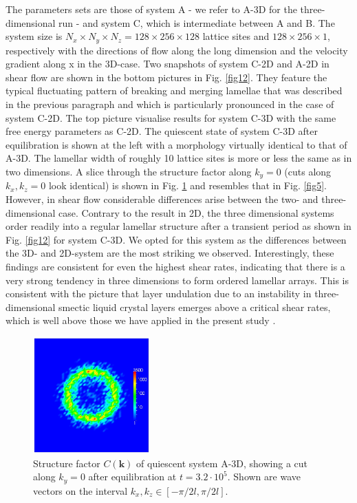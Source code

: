 \documentclass[8.5pt,twoside,twocolumn]{article}
\newcommand{\e}[1]{\cdot10^{#1}}
\begin{document}
The parameters sets are those of system A - we refer to A-3D for the three-dimensional run - and system C, which is intermediate between A and B.
The system size is $N_x\times N_y \times N_z=128\times256\times128$ lattice sites and $128\times256\times1$, respectively with the directions of flow along the long dimension and the velocity gradient along x in the 3D-case. 
Two snapshots of system C-2D and A-2D in shear flow are shown in the bottom pictures in Fig. \ref{fig12}.
They feature the typical fluctuating pattern of breaking and merging lamellae that was described in the previous paragraph and which is particularly pronounced in the case of system C-2D.
The top picture visualise results for system C-3D with the same free energy parameters as C-2D.
The quiescent state of system C-3D after equilibration is shown at the left with a morphology virtually identical to that of A-3D.
The lamellar width of roughly 10 lattice sites is more or less the same as in two dimensions.
A slice through the structure factor along $k_y=0$ (cuts along $k_x,k_z=0$ look identical) is shown in Fig. \ref{fig13} and resembles that in Fig. \ref{fig5}.
However, in shear flow considerable differences arise between the two- and three-dimensional case.
Contrary to the result in 2D, the three dimensional systems order readily into a regular lamellar structure after a transient period as shown in Fig. \ref{fig12} for system C-3D. 
We opted for this system as the differences between the 3D- and 2D-system are the most striking we observed.
Interestingly, these findings are consistent for even the highest shear rates, indicating that there is a very strong tendency in three dimensions to form ordered lamellar arrays.
This is consistent with the picture that layer undulation due to an instability in three-dimensional smectic liquid crystal layers emerges above a critical shear rates, which is well above those we have applied in the present study \cite{Guo2002,Soddemann2004, Stewart2009}. 

\begin{figure}[htp!]
\centering
\includegraphics[angle=0,width=0.40\textwidth]{ck_y-slice_run786_320.jpg}
\caption{Structure factor $C({\mathbf k})$ of quiescent system A-3D, showing a cut along $k_y=0$ after equilibration at $t=3.2\e{5}$. Shown are wave vectors on the interval $k_x, k_z\in[-\pi/2 l,\pi/2 l]$.}
\label{fig13}
\end{figure}
\end{document}

